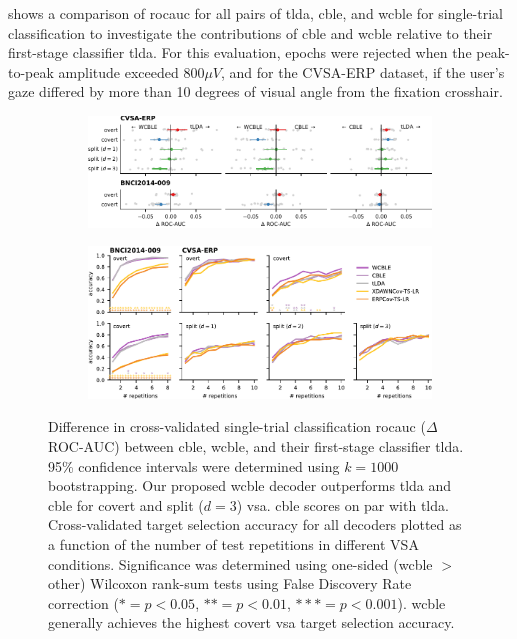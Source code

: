  shows a comparison of \ac{rocauc}
for all pairs of \ac{tlda}, \ac{cble},
and \ac{wcble} for single-trial classification to investigate the contributions of
\ac{cble} and \ac{wcble} relative to their first-stage classifier \ac{tlda}.
For this evaluation, epochs were rejected when the peak-to-peak amplitude
exceeded 800$\mu V$, and for the CVSA-ERP dataset, if the user's gaze differed by more than
10 degrees of visual angle from the fixation crosshair.
\begin{figure}
  \bigskip
	\begin{subfigure}{\linewidth}
		\caption{}
		\label{fig:covert-align/single-trial-roc-auc-diff}%
		\includegraphics[width=\linewidth]{figures/covert_align/figure4a.pdf}
	\end{subfigure}

	\bigskip

	\begin{subfigure}{\linewidth}
		\caption{}
		\label{fig:covert-align/block-eval}%
		\includegraphics[width=\linewidth]{figures/covert_align/figure4b.pdf}
	\end{subfigure}
  \caption[Decoder performance.]{%
		 Difference in cross-validated
    single-trial classification \acl{rocauc} ($\Delta$ROC-AUC)
    between \ac{cble}, \ac{wcble}, and their first-stage classifier \ac{tlda}.
    95\% confidence intervals were determined using $k=1000$ bootstrapping.
    Our proposed \ac{wcble} decoder outperforms \ac{tlda} and \ac{cble} for covert and split
    ($d=3$)	\ac{vsa}. \ac{cble} scores on par with \ac{tlda}.
		 Cross-validated target selection accuracy for
    all decoders plotted as a function of the number of test repetitions in
    different VSA conditions. Significance was determined using one-sided
    (\ac{wcble} $>$ other) Wilcoxon rank-sum tests using False Discovery Rate correction
    ($*= p<0.05$, $**=p<0.01$, $***=p<0.001$). \ac{wcble} generally achieves the highest
    covert \ac{vsa} target selection accuracy.}
\end{figure}
